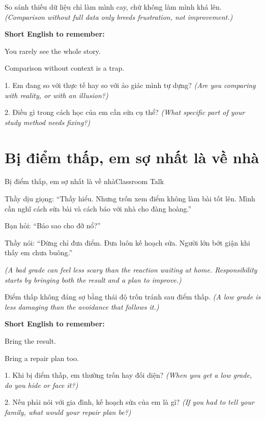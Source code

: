 \begin{baihoc}
So sánh thiếu dữ liệu chỉ làm mình cay, chứ không làm mình khá lên.
\textit{(Comparison without full data only breeds frustration, not improvement.)}
\end{baihoc}

\begin{ghinhoanh}
\textbf{Short English to remember:}

You rarely see the whole story.

Comparison without context is a trap.
\end{ghinhoanh}

\begin{tuhocnhanh}
1. Em đang so với thực tế hay so với ảo giác mình tự dựng? \textit{(Are you comparing with reality, or with an illusion?)}

2. Điều gì trong cách học của em cần sửa cụ thể? \textit{(What specific part of your study method needs fixing?)}
\end{tuhocnhanh}
\ngancach

\section{Bị điểm thấp, em sợ nhất là về nhà}
\begin{truyen}{Bị điểm thấp, em sợ nhất là về nhà}{Classroom Talk}

Thầy dịu giọng: ``Thầy hiểu. Nhưng trốn xem điểm không làm bài tốt lên. Mình cần nghĩ cách sửa bài và cách báo với nhà cho đàng hoàng.''

Bạn hỏi: ``Báo sao cho đỡ nổ?''

Thầy nói: ``Đừng chỉ đưa điểm. Đưa luôn kế hoạch sửa. Người lớn bớt giận khi thấy em chưa buông.''

\textit{(A bad grade can feel less scary than the reaction waiting at home. Responsibility starts by bringing both the result and a plan to improve.)}
\end{truyen}

\begin{baihoc}
Điểm thấp không đáng sợ bằng thái độ trốn tránh sau điểm thấp.
\textit{(A low grade is less damaging than the avoidance that follows it.)}
\end{baihoc}

\begin{ghinhoanh}
\textbf{Short English to remember:}

Bring the result.

Bring a repair plan too.
\end{ghinhoanh}

\begin{tuhocnhanh}
1. Khi bị điểm thấp, em thường trốn hay đối diện? \textit{(When you get a low grade, do you hide or face it?)}

2. Nếu phải nói với gia đình, kế hoạch sửa của em là gì? \textit{(If you had to tell your family, what would your repair plan be?)}
\end{tuhocnhanh}
\ngancach